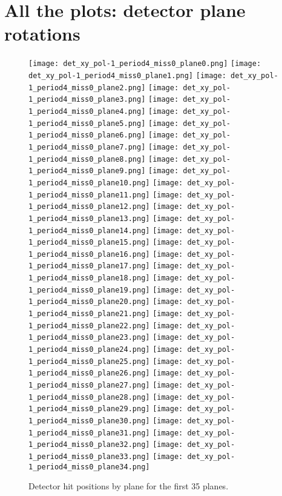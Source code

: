  
%
\section{All the plots: detector plane rotations}\label{app_fit_XY}

      \begin{figure}[h]	   
 \centering
        	\texttt{[image: det\_xy\_pol-1\_period4\_miss0\_plane0.png]}
	 	\texttt{[image: det\_xy\_pol-1\_period4\_miss0\_plane1.png]}
		 	\texttt{[image: det\_xy\_pol-1\_period4\_miss0\_plane2.png]}
			 	\texttt{[image: det\_xy\_pol-1\_period4\_miss0\_plane3.png]}
				\texttt{[image: det\_xy\_pol-1\_period4\_miss0\_plane4.png]}	 
        	\texttt{[image: det\_xy\_pol-1\_period4\_miss0\_plane5.png]}
	 	\texttt{[image: det\_xy\_pol-1\_period4\_miss0\_plane6.png]}
		 	\texttt{[image: det\_xy\_pol-1\_period4\_miss0\_plane7.png]}
			 	\texttt{[image: det\_xy\_pol-1\_period4\_miss0\_plane8.png]}
				\texttt{[image: det\_xy\_pol-1\_period4\_miss0\_plane9.png]}					
        	\texttt{[image: det\_xy\_pol-1\_period4\_miss0\_plane10.png]}
	 	\texttt{[image: det\_xy\_pol-1\_period4\_miss0\_plane11.png]}
		 	\texttt{[image: det\_xy\_pol-1\_period4\_miss0\_plane12.png]}
			 	\texttt{[image: det\_xy\_pol-1\_period4\_miss0\_plane13.png]}
				\texttt{[image: det\_xy\_pol-1\_period4\_miss0\_plane14.png]}
        	\texttt{[image: det\_xy\_pol-1\_period4\_miss0\_plane15.png]}
	 	\texttt{[image: det\_xy\_pol-1\_period4\_miss0\_plane16.png]}
		 	\texttt{[image: det\_xy\_pol-1\_period4\_miss0\_plane17.png]}
			 	\texttt{[image: det\_xy\_pol-1\_period4\_miss0\_plane18.png]}
				\texttt{[image: det\_xy\_pol-1\_period4\_miss0\_plane19.png]}
        	\texttt{[image: det\_xy\_pol-1\_period4\_miss0\_plane20.png]}
	 	\texttt{[image: det\_xy\_pol-1\_period4\_miss0\_plane21.png]}
		 	\texttt{[image: det\_xy\_pol-1\_period4\_miss0\_plane22.png]}
			 	\texttt{[image: det\_xy\_pol-1\_period4\_miss0\_plane23.png]}
				\texttt{[image: det\_xy\_pol-1\_period4\_miss0\_plane24.png]}
        	\texttt{[image: det\_xy\_pol-1\_period4\_miss0\_plane25.png]}
	 	\texttt{[image: det\_xy\_pol-1\_period4\_miss0\_plane26.png]}
		 	\texttt{[image: det\_xy\_pol-1\_period4\_miss0\_plane27.png]}
			 	\texttt{[image: det\_xy\_pol-1\_period4\_miss0\_plane28.png]}
				\texttt{[image: det\_xy\_pol-1\_period4\_miss0\_plane29.png]}
         	\texttt{[image: det\_xy\_pol-1\_period4\_miss0\_plane30.png]}
	 	\texttt{[image: det\_xy\_pol-1\_period4\_miss0\_plane31.png]}
		 	\texttt{[image: det\_xy\_pol-1\_period4\_miss0\_plane32.png]}
			 	\texttt{[image: det\_xy\_pol-1\_period4\_miss0\_plane33.png]}
				\texttt{[image: det\_xy\_pol-1\_period4\_miss0\_plane34.png]}
   \caption[short]{Detector hit positions by plane for the first 35 planes.}
   \label{fig_dethit_first35}
  \end{figure}
  
